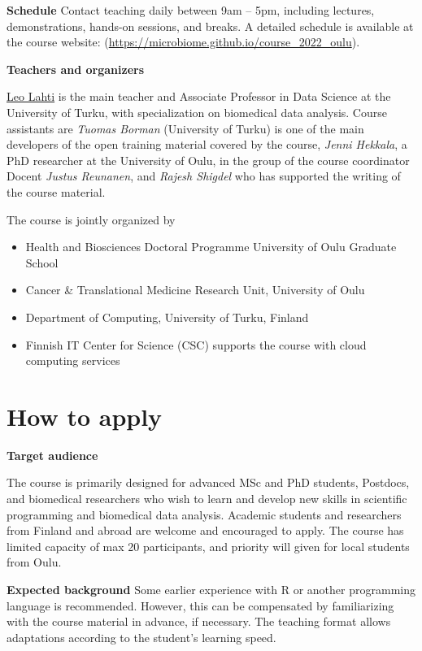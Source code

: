 \documentclass[
  oneside]{book}
\providecommand{\tightlist}{%
  \setlength{\itemsep}{0pt}\setlength{\parskip}{0pt}}
\begin{document}
\textbf{Schedule} Contact teaching daily between 9am -- 5pm, including
lectures, demonstrations, hands-on sessions, and breaks. A
detailed schedule is available at the course website:
(\url{https://microbiome.github.io/course_2022_oulu}).

\textbf{Teachers and organizers}

\href{https://datascience.utu.fi}{Leo Lahti} is the main teacher and Associate Professor in Data Science at the University of Turku, with specialization on biomedical data analysis. Course assistants are \emph{Tuomas Borman} (University of Turku) is one of the main developers of the open training material covered by the course, \emph{Jenni Hekkala}, a PhD researcher at the University of Oulu, in the group of the course coordinator Docent \emph{Justus Reunanen}, and \emph{Rajesh Shigdel} who has supported the writing of the course material.

The course is jointly organized by

\begin{itemize}
\tightlist
\item
  Health and Biosciences Doctoral Programme University of Oulu Graduate School
\item
  Cancer \& Translational Medicine Research Unit, University of Oulu
\item
  Department of Computing, University of Turku, Finland
\item
  Finnish IT Center for Science (CSC) supports the course with cloud
  computing services
\end{itemize}

\hypertarget{how-to-apply}{%
\section{How to apply}\label{how-to-apply}}

\textbf{Target audience}

The course is primarily designed for advanced MSc and PhD students,
Postdocs, and biomedical researchers who wish to learn and develop new skills in
scientific programming and biomedical data analysis. Academic students
and researchers from Finland and abroad are welcome and encouraged to
apply. The course has limited capacity of max 20 participants, and
priority will given for local students from Oulu.

\textbf{Expected background} Some earlier experience with R or another
programming language is recommended. However, this can be
compensated by familiarizing with the course material in advance, if
necessary. The teaching format allows adaptations according to the
student's learning speed.
\end{document}
